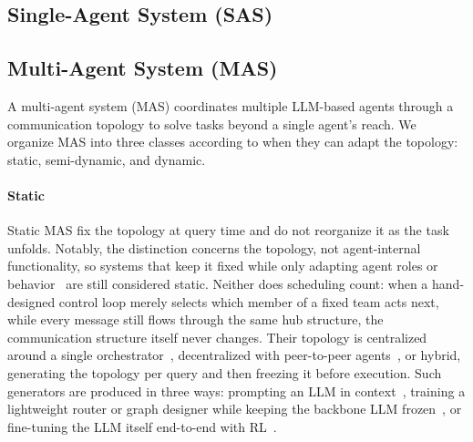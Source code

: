 \documentclass{article} %
\begin{document}
\begin{table}[t]
\label{tab:comparison}
\end{table}

\subsection{Single-Agent System (SAS)}

\subsection{Multi-Agent System (MAS)}

A multi-agent system (MAS) coordinates multiple LLM-based agents through a communication topology to solve tasks beyond a single agent's reach. We organize MAS into three classes according to when they can adapt the topology: static, semi-dynamic, and dynamic.

\paragraph{Static}
Static MAS fix the topology at query time and do not reorganize it as the task unfolds. Notably, the distinction concerns the topology, not agent-internal functionality, so systems that keep it fixed while only adapting agent roles or behavior~\citep{xue2026comas,peng2026sage,lu2024morphagent} are still considered static. Neither does scheduling count: when a hand-designed control loop merely selects which member of a fixed team acts next, while every message still flows through the same hub structure, the communication structure itself never changes.
Their topology is centralized around a single orchestrator~\citep{fourney2024magentic,chen2023autoagents}, decentralized with peer-to-peer agents~\citep{hao2026decentmem,zhuge2024gptswarm}, or hybrid, generating the topology per query and then freezing it before execution. Such generators are produced in three ways: prompting an LLM in context~\citep{lin2024think}, training a lightweight router or graph designer while keeping the backbone LLM frozen~\citep{yue2025masrouter,zhang2024gdesigner}, or fine-tuning the LLM itself end-to-end with RL~\citep{nielsen2026conductor,zhang2026metaagentx}.
\end{document}
